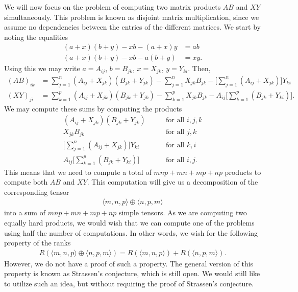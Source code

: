 \documentclass{article}
\theoremstyle{plain}
\theoremstyle{definition}
\theoremstyle{remark}
\begin{document}
We will now focus on the problem of computing two matrix products $AB$ and $XY$ simultaneously. This problem is known as disjoint matrix multiplication, since we assume no dependencies between the entries of the different matrices. We start by noting the equalities
\begin{align*}
    (a + x)(b + y) - xb - (a + x)y &= ab \\
    (a + x)(b + y) - xb - a(b + y) &= xy.
\end{align*}
Using this we may write $a = A_{ij}$, $b = B_{jk}$, $x = X_{jk}$, $y = Y_{ki}$. Then,
\begin{align*}
    (AB)_{ik} &= \sum_{j=1}^n (A_{ij} + X_{jk})(B_{jk} + Y_{jk}) - \sum_{j=1}^n X_{jk} B_{jk} - \bigg[\sum_{j=1}^n (A_{ij} + X_{jk}) \bigg] Y_{ki} \\
    (XY)_{ji} &= \sum_{k=1}^p (A_{ij} + X_{jk})(B_{jk} + Y_{jk}) - \sum_{k=1}^p X_{jk} B_{jk} - A_{ij}\bigg[\sum_{k=1}^p (B_{jk} + Y_{ki}) \bigg].
\end{align*}
We may compute these sums by computing the products 
\begin{align*}
    (A_{ij} + X_{jk})(B_{jk} + Y_{jk}) \qquad &\text{for all $i, j, k$} \\
    X_{jk} B_{jk} \qquad &\text{for all $j, k$} \\
    \bigg[\sum_{j=1}^n (A_{ij} + X_{jk}) \bigg] Y_{ki} \qquad &\text{for all $k, i$} \\
    A_{ij}\bigg[\sum_{k=1}^p (B_{jk} + Y_{ki}) \bigg] \qquad &\text{for all $i, j$}.
\end{align*}
This means that we need to compute a total of $mnp + mn + mp + np$ products to compute both $AB$ and $XY$. This computation will give us a decomposition of the corresponding tensor
\begin{align*}
    \langle m, n, p \rangle \oplus \langle n, p, m \rangle
\end{align*}
into a sum of $mnp + mn + mp + np$ simple tensors. As we are computing two equally hard products, we would wish that we can compute one of the problems using half the number of computations. In other words, we wish for the following property of the ranks
\begin{align*}
    R(\langle m, n, p \rangle \oplus \langle n, p, m \rangle) = R(\langle m, n, p \rangle) + R(\langle n, p, m \rangle).
\end{align*}
However, we do not have a proof of such a property. The general version of this property is known as Strassen's conjecture, which is still open. We would still like to utilize such an idea, but without requiring the proof of Strassen's conjecture.
\end{document}
